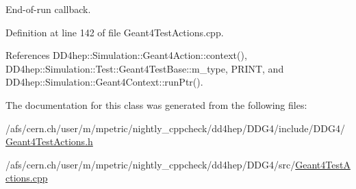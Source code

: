 End-\/of-\/run callback. 

Definition at line 142 of file Geant4TestActions.cpp.

References DD4hep::Simulation::Geant4Action::context(), DD4hep::Simulation::Test::Geant4TestBase::m\_\-type, PRINT, and DD4hep::Simulation::Geant4Context::runPtr().

The documentation for this class was generated from the following files:\begin{DoxyCompactItemize}
\item 
/afs/cern.ch/user/m/mpetric/nightly\_\-cppcheck/dd4hep/DDG4/include/DDG4/\hyperlink{_geant4_test_actions_8h}{Geant4TestActions.h}\item 
/afs/cern.ch/user/m/mpetric/nightly\_\-cppcheck/dd4hep/DDG4/src/\hyperlink{_geant4_test_actions_8cpp}{Geant4TestActions.cpp}\end{DoxyCompactItemize}
